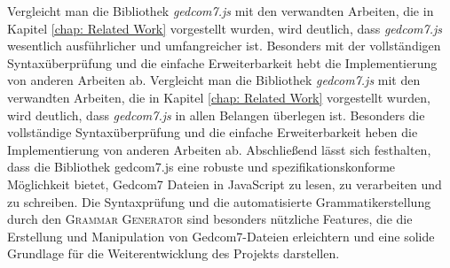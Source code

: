 Vergleicht man die Bibliothek \textit{gedcom7.js} mit den verwandten Arbeiten, die in Kapitel \ref{chap: Related Work} vorgestellt wurden, wird deutlich, dass \textit{gedcom7.js} wesentlich ausführlicher und umfangreicher ist. Besonders mit der vollständigen Syntaxüberprüfung und die einfache Erweiterbarkeit hebt die Implementierung von anderen Arbeiten ab. 
Vergleicht man die Bibliothek \textit{gedcom7.js} mit den verwandten Arbeiten, die in Kapitel \ref{chap: Related Work} vorgestellt wurden, wird deutlich, dass \textit{gedcom7.js} in allen Belangen überlegen ist. Besonders die vollständige Syntaxüberprüfung und die einfache Erweiterbarkeit heben die Implementierung von anderen Arbeiten ab. 
\newpage
{
\noindent
Abschließend lässt sich festhalten, dass die Bibliothek gedcom7.js eine robuste und spezifikationskonforme Möglichkeit bietet, Gedcom7 Dateien in JavaScript zu lesen, zu verarbeiten und zu schreiben. Die Syntaxprüfung und die automatisierte Grammatikerstellung durch den \textsc{Grammar Generator} sind besonders nützliche Features, die die Erstellung und Manipulation von Gedcom7-Dateien erleichtern und eine solide Grundlage für die Weiterentwicklung des Projekts darstellen.
}